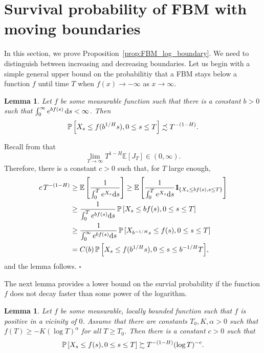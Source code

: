 \documentclass[11pt]{article}
\theoremstyle{plain}
\newtheorem{lem}[thm]{Lemma}
\theoremstyle{definition}
\renewenvironment{proof}[1][] {\smallskip \noindent {\bf Proof#1.} }{\hspace*{\fill}$\square$\medskip\par}
\begin{document}
\section{Survival probability of FBM with moving boundaries}\label{sec:fbm_mov}
In this section, we prove Proposition~\ref{prop:FBM_log_boundary}. We need to distinguish between increasing and decreasing boundaries. Let us begin with a simple general upper bound on the probabilitiy that a FBM stays below a function $f$ until time $T$ when $f(x) \to -\infty$ as $x \to \infty$.
\begin{lem}\label{lem:FBM_barrier_upper_bound}
Let $f$ be some measurable function such that there is a constant $b > 0$ such that $\int_0^\infty e^{b f(s)} \, {{\rm d}} s < \infty$. Then
$$
 {{{\bf {\mathbb{P}}}}\left[{X_s\leq f(b^{1/H} s), 0 \le  s \le T}\right]} \precsim T^{-(1-H)}.
$$
\end{lem}
\begin{proof}
Recall from \cite[Statement~1]{molchan:1999a} that
$$
\lim_{T\to\infty} T^{1-H} {\mathbb{E}\left[{ J_T }\right]} \in(0,\infty).
$$
Therefore, there is a constant $c > 0$ such that, for $T$ large enough,
\begin{align*}
c \, T^{-(1-H)} & \geq {\mathbb{E}\left[{ \frac{1}{\int_0^T e^{X_s} {{\rm d}} s} }\right]} \geq {\mathbb{E}\left[{ \frac{1}{\int_0^T e^{X_s} {{\rm d}} s} {1\hspace{-0.098cm}\mathrm{l}}_{\{ X_s \leq b f(s), s\leq T\} } }\right]} \\
             & \geq \frac{1}{\int_0^T e^{b f(s)} {{\rm d}} s}\, {{{\bf {\mathbb{P}}}}\left[{ X_s \le b f(s), 0 \le s \le T}\right]} \\
             & \geq \frac{1}{\int_0^\infty e^{b f(s)} {{\rm d}} s}\,  {{{\bf {\mathbb{P}}}}\left[{ X_{b^{-1/H} s} \leq f(s), 0 \le s \leq T}\right]} \\
	     & = C(b) \, {{{\bf {\mathbb{P}}}}\left[{ X_s \leq f(b^{1/H} s), 0 \le s \leq b^{-1/H} T}\right]},
\end{align*}
and the lemma follows.
\end{proof}
The next lemma provides a lower bound on the survial probability if the function $f$ does not decay faster than some power of the logarithm.
\begin{lem}\label{lem:FBM_barrier_lower_bound}
   Let $f$ be some measurable, locally bounded function such that $f$ is positive in a vicinity of $0$. Assume that there are constants $T_0, K, \alpha > 0$ such that $f(T) \ge -K (\log T)^\alpha$ for all $T \ge T_0$. Then there is a constant $c >0$ such that
\[
   {{{\bf {\mathbb{P}}}}\left[{X_s \le f(s), 0 \le s \le T}\right]} \succsim T^{-(1-H)} (\log T)^{-c}.
\]
\end{lem}
\end{document}
